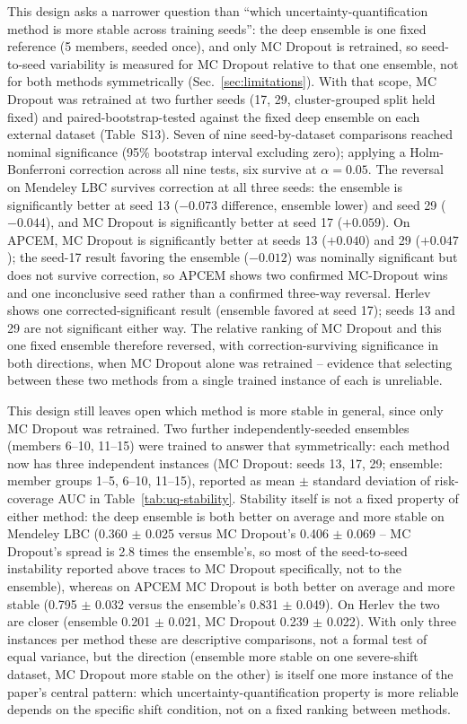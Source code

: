 \documentclass[12pt,letterpaper]{article}
\begin{document}
This design asks a narrower question than ``which uncertainty-quantification method is more stable across training seeds'': the deep ensemble is one fixed reference (5 members, seeded once), and only MC Dropout is retrained, so seed-to-seed variability is measured for MC Dropout relative to that one ensemble, not for both methods symmetrically (Sec.~\ref{sec:limitations}). With that scope, MC Dropout was retrained at two further seeds (17, 29, cluster-grouped split held fixed) and paired-bootstrap-tested against the fixed deep ensemble on each external dataset (Table~S13). Seven of nine seed-by-dataset comparisons reached nominal significance (95\% bootstrap interval excluding zero); applying a Holm-Bonferroni correction across all nine tests, six survive at $\alpha=0.05$. The reversal on Mendeley LBC survives correction at all three seeds: the ensemble is significantly better at seed 13 ($-0.073$ difference, ensemble lower) and seed 29 ($-0.044$), and MC Dropout is significantly better at seed 17 ($+0.059$). On APCEM, MC Dropout is significantly better at seeds 13 ($+0.040$) and 29 ($+0.047$); the seed-17 result favoring the ensemble ($-0.012$) was nominally significant but does not survive correction, so APCEM shows two confirmed MC-Dropout wins and one inconclusive seed rather than a confirmed three-way reversal. Herlev shows one corrected-significant result (ensemble favored at seed 17); seeds 13 and 29 are not significant either way. The relative ranking of MC Dropout and this one fixed ensemble therefore reversed, with correction-surviving significance in both directions, when MC Dropout alone was retrained -- evidence that selecting between these two methods from a single trained instance of each is unreliable.

This design still leaves open which method is more stable in general, since only MC Dropout was retrained. Two further independently-seeded ensembles (members 6--10, 11--15) were trained to answer that symmetrically: each method now has three independent instances (MC Dropout: seeds 13, 17, 29; ensemble: member groups 1--5, 6--10, 11--15), reported as mean $\pm$ standard deviation of risk-coverage AUC in Table~\ref{tab:uq-stability}. Stability itself is not a fixed property of either method: the deep ensemble is both better on average and more stable on Mendeley LBC (0.360 $\pm$ 0.025 versus MC Dropout's 0.406 $\pm$ 0.069 -- MC Dropout's spread is 2.8 times the ensemble's, so most of the seed-to-seed instability reported above traces to MC Dropout specifically, not to the ensemble), whereas on APCEM MC Dropout is both better on average and more stable (0.795 $\pm$ 0.032 versus the ensemble's 0.831 $\pm$ 0.049). On Herlev the two are closer (ensemble 0.201 $\pm$ 0.021, MC Dropout 0.239 $\pm$ 0.022). With only three instances per method these are descriptive comparisons, not a formal test of equal variance, but the direction (ensemble more stable on one severe-shift dataset, MC Dropout more stable on the other) is itself one more instance of the paper's central pattern: which uncertainty-quantification property is more reliable depends on the specific shift condition, not on a fixed ranking between methods.
\end{document}
